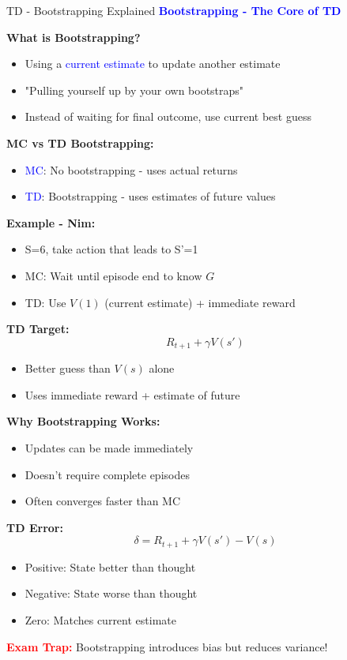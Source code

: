 \documentclass[8pt]{beamer}
\begin{document}
\begin{frame}{TD - Bootstrapping Explained}
\fontsize{6.5}{7.5}\selectfont
\textcolor{blue}{\textbf{Bootstrapping - The Core of TD}}

\textbf{What is Bootstrapping?}
\begin{itemize}
\item Using a \textcolor{blue}{current estimate} to update another estimate
\item "Pulling yourself up by your own bootstraps"
\item Instead of waiting for final outcome, use current best guess
\end{itemize}

\textbf{MC vs TD Bootstrapping:}
\begin{itemize}
\item \textcolor{blue}{MC}: No bootstrapping - uses actual returns
\item \textcolor{blue}{TD}: Bootstrapping - uses estimates of future values
\end{itemize}

\textbf{Example - Nim:}
\begin{itemize}
\item S=6, take action that leads to S'=1
\item MC: Wait until episode end to know $G$
\item TD: Use $V(1)$ (current estimate) + immediate reward
\end{itemize}

\textbf{TD Target:}
\[
R_{t+1} + \gamma V(s')
\]
\begin{itemize}
\item Better guess than $V(s)$ alone
\item Uses immediate reward + estimate of future
\end{itemize}

\textbf{Why Bootstrapping Works:}
\begin{itemize}
\item Updates can be made immediately
\item Doesn't require complete episodes
\item Often converges faster than MC
\end{itemize}

\textbf{TD Error:}
\[
\delta = R_{t+1} + \gamma V(s') - V(s)
\]
\begin{itemize}
\item Positive: State better than thought
\item Negative: State worse than thought
\item Zero: Matches current estimate
\end{itemize}

\textcolor{red}{\textbf{Exam Trap:}} Bootstrapping introduces bias but reduces variance!
\end{frame}
\end{document}
